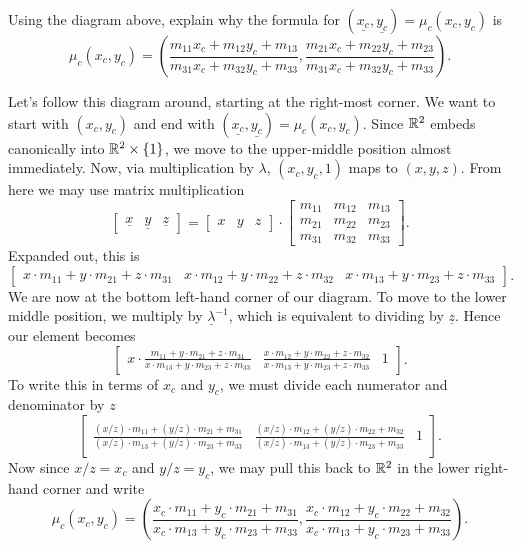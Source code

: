 \documentclass[newpage,hints,handout,12pt,nooutcomes,noauthor]{ximera}
\begin{document}
\begin{problem}
  Using the diagram above, explain why the formula for
  $(\underline{x_{c}},\underline{y_{c}})=\mu_{c}(x_{c},y_{c})$ is
  $$\mu_c(x_c,y_c)=\left(
    \frac{m_{11}x_c+m_{12}y_c+m_{13}}{m_{31}x_c+m_{32}y_c+m_{33}},
    \frac{m_{21}x_c+m_{22}y_c+m_{23}}{m_{31}x_c+m_{32}y_c+m_{33}}
    \right).$$
  \begin{freeResponse}
    Let's follow this diagram around, starting at the right-most
    corner. We want to start with $(x_c,y_c)$ and end with
    $(\underline{x_c},\underline{y_c}) = \mu_c(x_c,y_c)$. Since $\mathbb R^2$
    embeds canonically into $\mathbb R^2\times\{1\}$, we move to the
    upper-middle position almost immediately. Now, via multiplication
    by $\lambda$, $(x_c,y_c,1)$ maps to $(x,y,z)$. From here we may use
    matrix multiplication
    \[
    \begin{bmatrix}
      \underline{x} & \underline{y} & \underline{z}
    \end{bmatrix}
    =
    \begin{bmatrix}
    x & y & z
    \end{bmatrix}
    \cdot\begin{bmatrix}
    m_{11} & m_{12} & m_{13}\\
    m_{21} & m_{22} & m_{23}\\
    m_{31} & m_{32} & m_{33}
    \end{bmatrix}.
    \]
    Expanded out, this is
    \[
    \begin{bmatrix}
      x\cdot m_{11}+y\cdot m_{21}+z\cdot m_{31} & x\cdot m_{12}+y\cdot m_{22}+z\cdot m_{32} & 
      x\cdot m_{13}+y\cdot m_{23}+z\cdot m_{33}
    \end{bmatrix}.
    \]
    We are now at the bottom left-hand corner of our diagram. To move
    to the lower middle position, we multiply by $\underline{\lambda}^{-1}$, which
    is equivalent to dividing by $\underline{z}$. Hence our element
    becomes
     \[
    \begin{bmatrix}
      x\cdot \frac{m_{11}+y\cdot m_{21}+z\cdot m_{31}}{x\cdot m_{13}+y\cdot m_{23}+z\cdot m_{33}} &
      \frac{x\cdot m_{12}+y\cdot m_{22}+z\cdot m_{32}}{x\cdot m_{13}+y\cdot m_{23}+z\cdot m_{33}} & 1
    \end{bmatrix}.
    \]
    To write this in terms of $x_c$ and $y_c$, we must divide each
    numerator and denominator by $z$
    \[
    \begin{bmatrix}
      \frac{(x/z)\cdot m_{11}+(y/z)\cdot m_{21}+m_{31}}{(x/z)\cdot m_{13}+(y/z)\cdot m_{23}+m_{33}}
      &
      \frac{(x/z)\cdot m_{12}+(y/z)\cdot m_{22}+m_{32}}{(x/z)\cdot m_{13}+(y/z)\cdot m_{23}+m_{33}}
      & 1
    \end{bmatrix}.
    \]
    Now since $x/z = x_c$ and $y/z =y_c$, we may pull this back to
    $\mathbb R^2$ in the lower right-hand corner and write
    \[
    \mu_c(x_c,y_c) = \left(
    \frac{x_c\cdot m_{11} + y_c\cdot m_{21} + m_{31}}{x_c\cdot m_{13} + y_c\cdot m_{23} + m_{33}},
    \frac{x_c\cdot m_{12} + y_c\cdot m_{22} + m_{32}}{x_c\cdot m_{13} + y_c\cdot m_{23} + m_{33}}
    \right).
    \]
  \end{freeResponse}
\end{problem}
\end{document}
